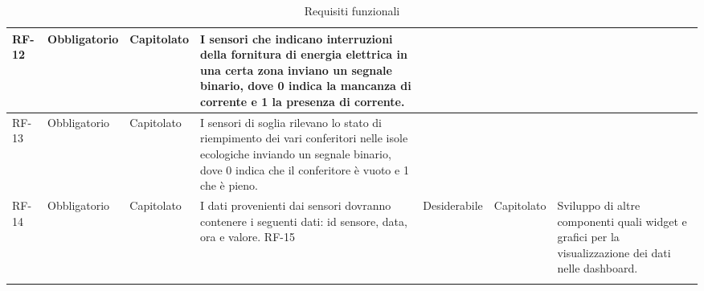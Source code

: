 \begin{longtable}{|>{\centering\arraybackslash}m{}|>{\centering\arraybackslash}m{}|>{\centering\arraybackslash}m{}|>{\centering\arraybackslash}m{}|}
	RF-12           & Obbligatorio        & Capitolato     & I sensori che indicano interruzioni della fornitura di energia elettrica in una certa zona inviano un segnale binario, dove 0 indica la mancanza di corrente e 1 la presenza di corrente.                                                                                                                          \\\hline
	RF-13           & Obbligatorio        & Capitolato     & I sensori di soglia rilevano lo stato di riempimento dei vari conferitori nelle isole ecologiche inviando un segnale binario, dove 0 indica che il conferitore è vuoto e 1 che è pieno.                                                                                                                            \\\hline
	RF-14           & Obbligatorio        & Capitolato     & I dati provenienti dai sensori dovranno contenere i seguenti dati: id sensore, data, ora e valore.
	RF-15           & Desiderabile        & Capitolato     & Sviluppo di altre componenti quali widget e grafici per la visualizzazione dei dati nelle dashboard.                                                                                                                                                                                                               \\\hline

	\caption{Requisiti funzionali}
	\label{table:2}
\end{longtable}
